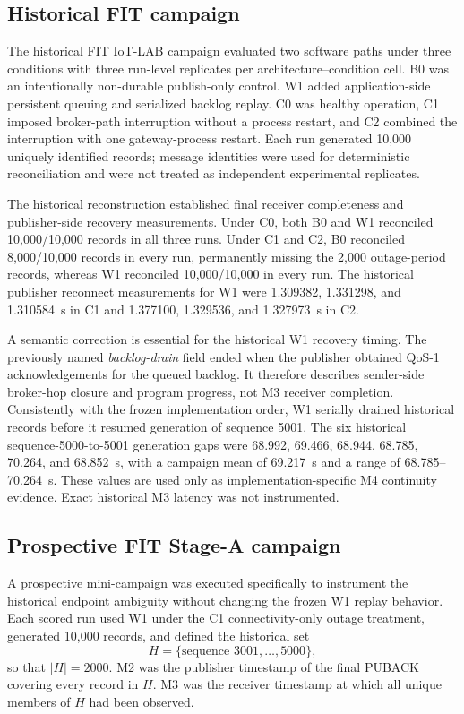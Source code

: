 \documentclass[journal]{IEEEtran}
\begin{document}
\subsection{Historical FIT campaign}

The historical FIT IoT-LAB campaign \cite{fitlab} evaluated two software paths under three conditions with three run-level replicates per architecture--condition cell. B0 was an intentionally non-durable publish-only control. W1 added application-side persistent queuing and serialized backlog replay. C0 was healthy operation, C1 imposed broker-path interruption without a process restart, and C2 combined the interruption with one gateway-process restart. Each run generated 10,000 uniquely identified records; message identities were used for deterministic reconciliation and were not treated as independent experimental replicates.

The historical reconstruction established final receiver completeness and publisher-side recovery measurements. Under C0, both B0 and W1 reconciled 10,000/10,000 records in all three runs. Under C1 and C2, B0 reconciled 8,000/10,000 records in every run, permanently missing the 2,000 outage-period records, whereas W1 reconciled 10,000/10,000 in every run. The historical publisher reconnect measurements for W1 were 1.309382, 1.331298, and 1.310584~s in C1 and 1.377100, 1.329536, and 1.327973~s in C2.

A semantic correction is essential for the historical W1 recovery timing. The previously named \emph{backlog-drain} field ended when the publisher obtained QoS-1 acknowledgements for the queued backlog. It therefore describes sender-side broker-hop closure and program progress, not M3 receiver completion. Consistently with the frozen implementation order, W1 serially drained historical records before it resumed generation of sequence 5001. The six historical sequence-5000-to-5001 generation gaps were 68.992, 69.466, 68.944, 68.785, 70.264, and 68.852~s, with a campaign mean of 69.217~s and a range of 68.785--70.264~s. These values are used only as implementation-specific M4 continuity evidence. Exact historical M3 latency was not instrumented.

\subsection{Prospective FIT Stage-A campaign}

A prospective mini-campaign was executed specifically to instrument the historical endpoint ambiguity without changing the frozen W1 replay behavior. Each scored run used W1 under the C1 connectivity-only outage treatment, generated 10,000 records, and defined the historical set
\[
H=\{\text{sequence }3001,\ldots,5000\},
\]
so that $|H|=2000$. M2 was the publisher timestamp of the final PUBACK covering every record in $H$. M3 was the receiver timestamp at which all unique members of $H$ had been observed.
\end{document}
